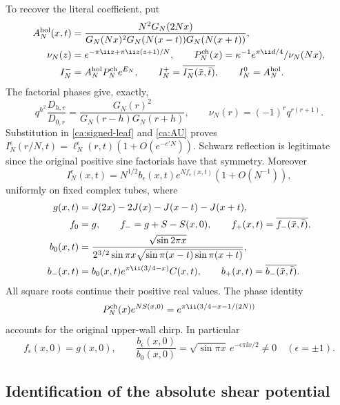 To recover the literal coefficient, put
\begin{align}
 A_N^{\rm hol}(x,t)&=
 \frac{N^2G_N(2Nx)}
 {G_N(Nx)^2G_N(N(x-t))G_N(N(x+t))},\notag\\
 \nu_N(z)&=e^{-\pi\ii z+\pi\ii z(z+1)/N},\qquad
 P_N^{\rm ch}(x)=\kappa^{-1}e^{\pi\ii d/4}/\nu_N(Nx),\notag\\
 I_N^-&=A_N^{\rm hol}P_N^{\rm ch}e^{E_N},\qquad
 I_N^+=\overline{I_N^-(\bar x,\bar t)},\qquad
 I_N^0=A_N^{\rm hol}.\label{ca:I}
\end{align}
The factorial phases give, exactly,
\[
 q^{h^2}\frac{D_{h,r}}{D_{0,r}}
  =\frac{G_N(r)^2}{G_N(r-h)G_N(r+h)},\qquad
 \nu_N(r)=(-1)^r q^{r(r+1)}.
\]
Substitution in \eqref{ca:signed-leaf} and \eqref{ca:AU} proves
$I_N^\epsilon(r/N,t)=\ell_N^\epsilon(r,t)(1+O(e^{-c'N}))$.
Schwarz reflection is legitimate since the original positive sine factorials have that symmetry. Moreover
\begin{equation}\label{ca:leaf-asymptotic}
 I_N^\epsilon(x,t)=N^{1/2}b_\epsilon(x,t)
                e^{Nf_\epsilon(x,t)}(1+O(N^{-1})),
\end{equation}
uniformly on fixed complex tubes, where
\begin{align}
 g(x,t)&=J(2x)-2J(x)-J(x-t)-J(x+t),\notag\\
 f_0&=g,\qquad f_-=g+S-S(x,0),\qquad
 f_+(x,t)=\overline{f_-(\bar x,\bar t)},\notag\\
 b_0(x,t)&=\frac{\sqrt{\sin2\pi x}}
 {2^{3/2}\sin\pi x\sqrt{\sin\pi(x-t)\sin\pi(x+t)}},\notag\\
 b_-(x,t)&=b_0(x,t)e^{\pi\ii(3/4-x)}C(x,t),
 \qquad b_+(x,t)=\overline{b_-(\bar x,\bar t)}.\label{ca:leaf-functions}
\end{align}
All square roots continue their positive real values. The phase identity
\[
 P_N^{\rm ch}(x)e^{NS(x,0)}
   =e^{\pi\ii(3/4-x-1/(2N))}
\]
accounts for the original upper-wall chirp. In particular
\begin{equation}\label{ca:leaf-amplitude0}
 f_\epsilon(x,0)=g(x,0),\qquad
 \frac{b_\epsilon(x,0)}{b_0(x,0)}
 =\sqrt{\sin\pi x}\,e^{-\epsilon\pi\ii x/2}\ne0
 \quad(\epsilon=\pm1).
\end{equation}

\subsection{Identification of the absolute shear potential}

